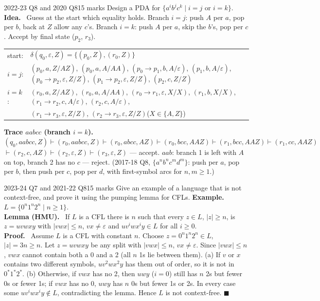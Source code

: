 \documentclass[10.5pt,a4paper]{article}
\newcommand{\ansh}[1]{\textbf{\color{exborder}#1}\ }
\newcommand{\eps}{\varepsilon}
\begin{document}
\begin{examq}{2022-23 Q8 and 2020 Q8}{15 marks}
Design a PDA for $\{a^ib^jc^k\mid i=j\text{ or }i=k\}$.
\tcblower
\ansh{Idea.} Guess at the start which equality holds. Branch $i=j$: push $A$ per $a$, pop per $b$, back at $Z$ allow any $c$'s.
Branch $i=k$: push $A$ per $a$, skip the $b$'s, pop per $c$. Accept by final state ($p_2$, $r_3$).
\begin{center}\small
\begin{tabular}{@{}ll@{}}
start: & $\delta(q_0,\eps,Z)=\{(p_0,Z),(r_0,Z)\}$\\
$i=j$: & $(p_0,a,Z/AZ)$, $(p_0,a,A/AA)$, $(p_0\to p_1,b,A/\eps)$, $(p_1,b,A/\eps)$, $(p_0\to p_2,\eps,Z/Z)$, $(p_1\to p_2,\eps,Z/Z)$, $(p_2,c,Z/Z)$\\
$i=k$: & $(r_0,a,Z/AZ)$, $(r_0,a,A/AA)$, $(r_0\to r_1,\eps,X/X)$, $(r_1,b,X/X)$, $(r_1\to r_2,c,A/\eps)$, $(r_2,c,A/\eps)$,\\
 & $(r_1\to r_3,\eps,Z/Z)$, $(r_2\to r_3,\eps,Z/Z)$\qquad ($X\in\{A,Z\}$)
\end{tabular}
\end{center}
\ansh{Trace $aabcc$ (branch $i=k$).} $(q_0,aabcc,Z)\vdash(r_0,aabcc,Z)\vdash(r_0,abcc,AZ)\vdash(r_0,bcc,AAZ)\vdash(r_1,bcc,AAZ)\vdash(r_1,cc,AAZ)$
$\vdash(r_2,c,AZ)\vdash(r_2,\eps,Z)\vdash(r_3,\eps,Z)$ --- accept. $aab$: branch 1 is left with $A$ on top, branch 2 has no $c$ --- reject.
(2017-18 Q8, $\{a^nb^nc^md^m\}$: push per $a$, pop per $b$, then push per $c$, pop per $d$, with first-symbol arcs for $n,m\ge1$.)
\end{examq}

\begin{examq}{2023-24 Q7 and 2021-22 Q8}{15 marks}
Give an example of a language that is not context-free, and prove it using the pumping lemma for CFLs.
\tcblower
\ansh{Example.} $L=\{0^n1^n2^n\mid n\ge1\}$.\\
\ansh{Lemma (HMU).} If $L$ is a CFL there is $n$ such that every $z\in L$, $|z|\ge n$, is $z=uvwxy$ with $|vwx|\le n$, $vx\ne\eps$ and
$uv^iwx^iy\in L$ for all $i\ge0$.\\
\ansh{Proof.} Assume $L$ is a CFL with constant $n$. Choose $z=0^n1^n2^n\in L$, $|z|=3n\ge n$. Let $z=uvwxy$ be any split with $|vwx|\le n$,
$vx\ne\eps$. Since $|vwx|\le n$, $vwx$ cannot contain both a 0 and a 2 (all $n$ 1s lie between them).
(a) If $v$ or $x$ contains two different symbols, $uv^2wx^2y$ has them out of order, so it is not in $0^*1^*2^*$.
(b) Otherwise, if $vwx$ has no 2, then $uwy$ ($i=0$) still has $n$ 2s but fewer 0s or fewer 1s; if $vwx$ has no 0, $uwy$ has $n$ 0s but
fewer 1s or 2s. In every case some $uv^iwx^iy\notin L$, contradicting the lemma. Hence $L$ is not context-free. $\blacksquare$
\end{examq}
\end{document}
